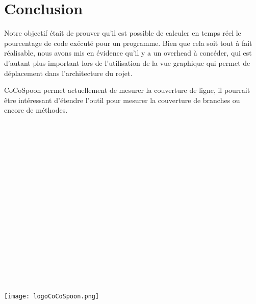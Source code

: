 \chapter*{Conclusion}
	\thispagestyle{conclusion}
	
\par Notre objectif était de prouver qu'il est possible de calculer en temps réel le pourcentage de code exécuté pour un programme. Bien que cela soit tout à fait réalisable, nous avons mis en évidence qu'il y a un overhead à concéder, qui est d'autant plus important lors de l'utilisation de la vue graphique qui permet de déplacement dans l'architecture du rojet.
\par CoCoSpoon permet actuellement de mesurer la couverture de ligne, il pourrait être intéressant d'étendre l'outil pour mesurer la couverture de branches ou encore de méthodes.

~\\
~\\
~\\
~\\
~\\
~\\
~\\
~\\
~\\
~\\
~\\
~\\
~\\
~\\
~\\
~\\
~\\

\centering
\texttt{[image: logoCoCoSpoon.png]}
